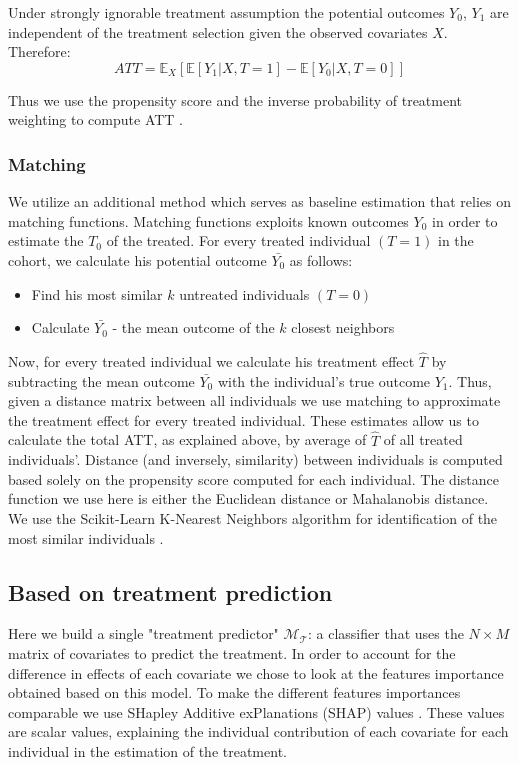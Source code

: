 \documentclass{article}
\begin{document}
Under strongly ignorable treatment assumption the potential outcomes $Y_0$, $Y_1$ are independent of the treatment selection given the observed covariates $X$. Therefore:
\begin{equation*}
    ATT = \mathbb{E}_X[\mathbb{E}[Y_1|X, T=1] - \mathbb{E}[Y_0 | X, T=0]]
\end{equation*}

Thus we use the propensity score and the inverse probability of treatment weighting to compute ATT \cite{abdia2017propensity}. 

\subsubsection{Matching}
We utilize an additional method which serves as baseline estimation that relies on matching functions. Matching functions exploits known outcomes $Y_0$ in order to estimate the $T_0$ of the treated.
For every treated individual $(T=1)$ in the cohort, we calculate his potential outcome $\bar{Y_0}$  as follows: 
\begin{itemize}
    \item Find his most similar $k$ untreated individuals $(T=0)$ 
    \item Calculate $\bar{Y_0}$ - the mean outcome of the $k$ closest neighbors 
\end{itemize}
Now, for every treated individual we calculate his treatment effect $\widehat{T}$ by subtracting the mean outcome $\bar{Y_0}$ with the individual's true outcome $Y_1$. 
Thus, given a distance matrix between all individuals we use matching to approximate the treatment effect for every treated individual. 
These estimates allow us to calculate the total ATT, as explained above, by average of $\widehat{T}$ of all treated individuals'. 
Distance (and inversely, similarity) between individuals is computed based solely on the propensity score computed for each individual. 
The distance function we use here is either the Euclidean distance or Mahalanobis distance.
We use the Scikit-Learn K-Nearest Neighbors algorithm for identification of the most similar individuals \cite{scikit-learn}. 

\subsection{Based on treatment prediction}
Here we build a single "treatment predictor" $\mathcal{M_T}$: a classifier that uses the $N\times{}M$ matrix of covariates to predict the treatment. 
In order to account for the difference in effects of each covariate we chose to look at the features importance obtained based on this model. 
To make the different features importances comparable we use SHapley Additive exPlanations (SHAP) values \cite{lundberg2017unified}. 
These values are scalar values, explaining the individual contribution of each covariate for each individual in the estimation of the treatment. 
\end{document}
